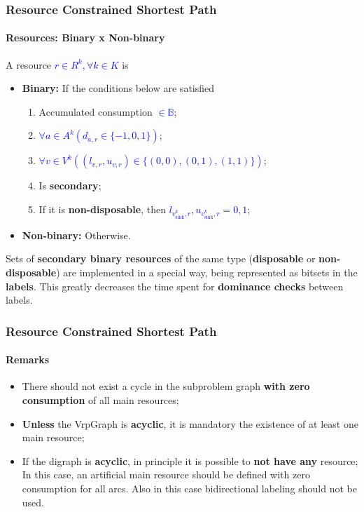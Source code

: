 \begin{frame}
  \frametitle{Resource Constrained Shortest Path}
  \framesubtitle{Resources: Binary x Non-binary}
  A resource \textcolor{blue}{$r \in R^k, \forall k \in K$} is
  \begin{itemize}
    \item \textbf{Binary:} If the conditions below are satisfied 
      \begin{enumerate}
        \item Accumulated consumption \textcolor{blue}{$\in \mathbb{B}$};
        \item \textcolor{blue}{$\forall a \in A^k (d_{a,r} \in \{-1, 0, 1\})$};
        \item \textcolor{blue}{$\forall v \in V^k ((l_{v,r}, u_{v,r}) \in \{(0, 0),  (0, 1), (1, 1)\})$};
        \item Is \textbf{secondary};
        \item If it is \textbf{non-disposable}, then \textcolor{blue}{$l_{v_{\text{sink}}^k,r}, u_{v_{\text{sink}}^k,r} = 0, 1$};
      \end{enumerate}
    \item \textbf{Non-binary:} Otherwise.
  \end{itemize}
  Sets of \textbf{secondary binary resources} of the same type (\textbf{disposable} or \textbf{non-disposable}) are implemented in a special way, being represented as bitsets in the \textbf{labels}. 
  This greatly decreases the time spent for \textbf{dominance checks} between labels.
\end{frame}

\begin{frame}
  \frametitle{Resource Constrained Shortest Path}
  \framesubtitle{Remarks}
  \begin{itemize}
    \item There should not exist a cycle in the subproblem graph \textbf{with zero consumption} of all main resources;
    \item \textbf{Unless} the VrpGraph is \textbf{acyclic}, it is mandatory the existence of at least one main resource;
    \item If the digraph is \textbf{acyclic}, in principle it is possible to \textbf{not have any} resource;
      In this case, an artificial main resource should be defined with zero consumption for all arcs. 
      Also in this case bidirectional labeling should not be used.
  \end{itemize}
\end{frame}

